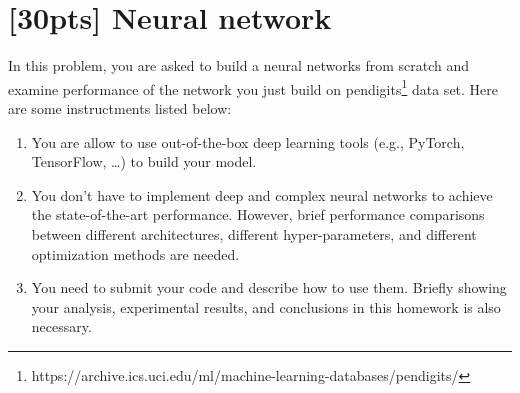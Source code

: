 \documentclass{article}
\begin{document}
    \newpage
    \section{[30pts] Neural network}
    In this problem, you are asked to build a neural networks from scratch and examine performance of the network you just build on pendigits\footnote{https://archive.ics.uci.edu/ml/machine-learning-databases/pendigits/} data set.
    Here are some instructments listed below:
    \begin{enumerate}
        \item You are allow to use out-of-the-box deep learning tools (e.g., PyTorch, TensorFlow, \ldots) to build your model.
        \item You don't have to implement deep and complex neural networks to achieve the state-of-the-art performance. However, brief performance comparisons between different architectures, different hyper-parameters, and different optimization methods are needed.
        \item You need to submit your code and describe how to use them. Briefly showing your analysis, experimental results, and conclusions in this homework is also necessary.
    \end{enumerate}
	
\end{document}
